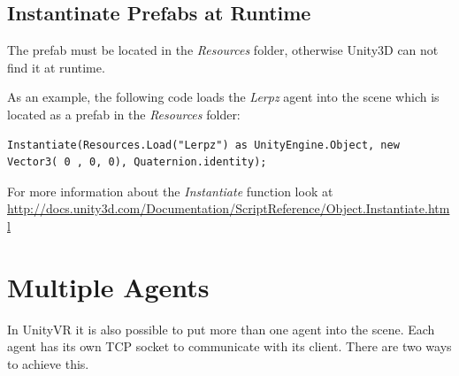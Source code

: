 \documentclass[10pt,final]{scrreprt}
\begin{document}
\subsection{Instantinate Prefabs at Runtime}

The prefab must be located in the \emph{Resources} folder, otherwise Unity3D can not find it at runtime.

As an example, the following code loads the \emph{Lerpz} agent into the scene which is located as a prefab in the \emph{Resources} folder:

\begin{lstlisting}
Instantiate(Resources.Load("Lerpz") as UnityEngine.Object, new Vector3( 0 , 0, 0), Quaternion.identity);
\end{lstlisting}



For more information about the \emph{Instantiate} function look at \url{http://docs.unity3d.com/Documentation/ScriptReference/Object.Instantiate.html}


\section{Multiple Agents}

In UnityVR it is also possible to put more than one agent into the scene. Each agent has its own TCP socket to communicate with its client. There are two ways to achieve this.
\end{document}
